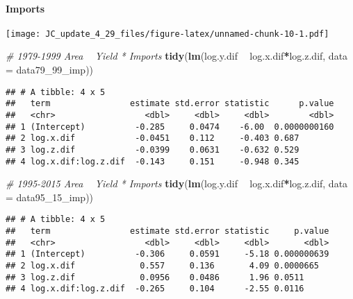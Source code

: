 \documentclass[
]{article}
\newenvironment{Shaded}{\begin{snugshade}}{\end{snugshade}}
\newcommand{\CommentTok}[1]{\textcolor[rgb]{0.56,0.35,0.01}{\textit{#1}}}
\newcommand{\DataTypeTok}[1]{\textcolor[rgb]{0.13,0.29,0.53}{#1}}
\newcommand{\DecValTok}[1]{\textcolor[rgb]{0.00,0.00,0.81}{#1}}
\newcommand{\KeywordTok}[1]{\textcolor[rgb]{0.13,0.29,0.53}{\textbf{#1}}}
\newcommand{\NormalTok}[1]{#1}
\newcommand{\OperatorTok}[1]{\textcolor[rgb]{0.81,0.36,0.00}{\textbf{#1}}}
\newcommand{\StringTok}[1]{\textcolor[rgb]{0.31,0.60,0.02}{#1}}
\begin{document}
\hypertarget{imports}{%
\paragraph{Imports}\label{imports}}

\texttt{[image: JC\_update\_4\_29\_files/figure-latex/unnamed-chunk-10-1.pdf]}

\begin{Shaded}
\begin{Highlighting}[]
\CommentTok{# 1979-1999 Area ~ Yield * Imports}
\KeywordTok{tidy}\NormalTok{(}\KeywordTok{lm}\NormalTok{(log.y.dif }\OperatorTok{~}\StringTok{ }\NormalTok{log.x.dif}\OperatorTok{*}\NormalTok{log.z.dif, }\DataTypeTok{data =}\NormalTok{ data79_}\DecValTok{99}\NormalTok{_imp))}
\end{Highlighting}
\end{Shaded}

\begin{verbatim}
## # A tibble: 4 x 5
##   term                estimate std.error statistic      p.value
##   <chr>                  <dbl>     <dbl>     <dbl>        <dbl>
## 1 (Intercept)          -0.285     0.0474    -6.00  0.0000000160
## 2 log.x.dif            -0.0451    0.112     -0.403 0.687       
## 3 log.z.dif            -0.0399    0.0631    -0.632 0.529       
## 4 log.x.dif:log.z.dif  -0.143     0.151     -0.948 0.345
\end{verbatim}

\begin{Shaded}
\begin{Highlighting}[]
\CommentTok{# 1995-2015 Area ~ Yield * Imports}
\KeywordTok{tidy}\NormalTok{(}\KeywordTok{lm}\NormalTok{(log.y.dif }\OperatorTok{~}\StringTok{ }\NormalTok{log.x.dif}\OperatorTok{*}\NormalTok{log.z.dif, }\DataTypeTok{data =}\NormalTok{ data95_}\DecValTok{15}\NormalTok{_imp))}
\end{Highlighting}
\end{Shaded}

\begin{verbatim}
## # A tibble: 4 x 5
##   term                estimate std.error statistic     p.value
##   <chr>                  <dbl>     <dbl>     <dbl>       <dbl>
## 1 (Intercept)          -0.306     0.0591     -5.18 0.000000639
## 2 log.x.dif             0.557     0.136       4.09 0.0000665  
## 3 log.z.dif             0.0956    0.0486      1.96 0.0511     
## 4 log.x.dif:log.z.dif  -0.265     0.104      -2.55 0.0116
\end{verbatim}
\end{document}
